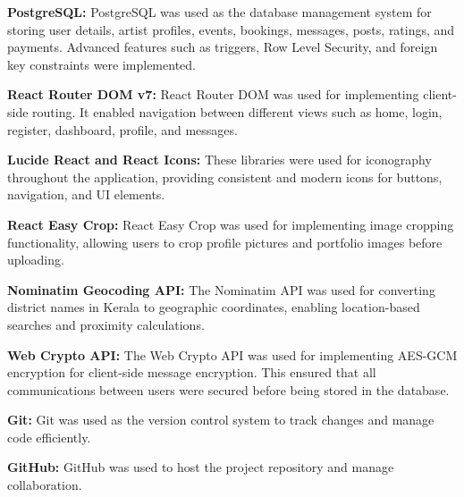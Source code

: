\documentclass[12pt,a4paper]{report}
\begin{document}
\vspace{0.4cm}

\textbf{PostgreSQL:}
PostgreSQL was used as the database management system for storing user details, artist profiles, events, bookings, messages, posts, ratings, and payments. Advanced features such as triggers, Row Level Security, and foreign key constraints were implemented.

\vspace{0.4cm}

\textbf{React Router DOM v7:}
React Router DOM was used for implementing client-side routing. It enabled navigation between different views such as home, login, register, dashboard, profile, and messages.

\vspace{0.4cm}

\textbf{Lucide React and React Icons:}
These libraries were used for iconography throughout the application, providing consistent and modern icons for buttons, navigation, and UI elements.

\vspace{0.4cm}

\textbf{React Easy Crop:}
React Easy Crop was used for implementing image cropping functionality, allowing users to crop profile pictures and portfolio images before uploading.

\vspace{0.4cm}

\textbf{Nominatim Geocoding API:}
The Nominatim API was used for converting district names in Kerala to geographic coordinates, enabling location-based searches and proximity calculations.

\vspace{0.4cm}

\textbf{Web Crypto API:}
The Web Crypto API was used for implementing AES-GCM encryption for client-side message encryption. This ensured that all communications between users were secured before being stored in the database.

\vspace{0.4cm}

\textbf{Git:}
Git was used as the version control system to track changes and manage code efficiently.

\vspace{0.4cm}

\textbf{GitHub:}
GitHub was used to host the project repository and manage collaboration.

\vspace{0.4cm}
\end{document}
